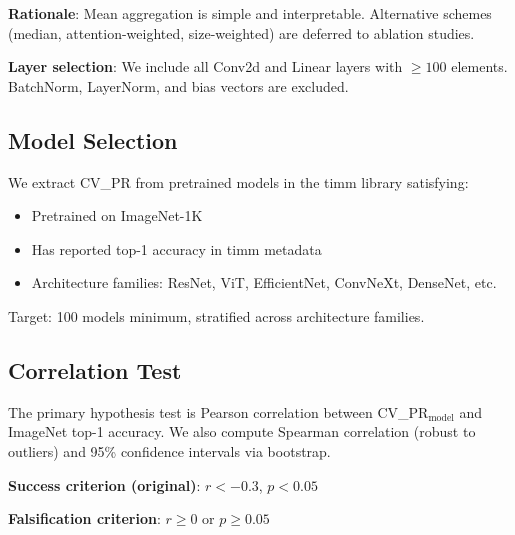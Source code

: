 \textbf{Rationale}: Mean aggregation is simple and interpretable. Alternative schemes (median, attention-weighted, size-weighted) are deferred to ablation studies.

\textbf{Layer selection}: We include all Conv2d and Linear layers with $\geq 100$ elements. BatchNorm, LayerNorm, and bias vectors are excluded.

\subsection{Model Selection}

We extract CV\_PR from pretrained models in the timm library satisfying:
\begin{itemize}
    \item Pretrained on ImageNet-1K
    \item Has reported top-1 accuracy in timm metadata
    \item Architecture families: ResNet, ViT, EfficientNet, ConvNeXt, DenseNet, etc.
\end{itemize}

Target: 100 models minimum, stratified across architecture families.

\subsection{Correlation Test}

The primary hypothesis test is Pearson correlation between CV\_PR$_{\text{model}}$ and ImageNet top-1 accuracy. We also compute Spearman correlation (robust to outliers) and 95\% confidence intervals via bootstrap.

\textbf{Success criterion (original)}: $r < -0.3$, $p < 0.05$

\textbf{Falsification criterion}: $r \geq 0$ or $p \geq 0.05$

